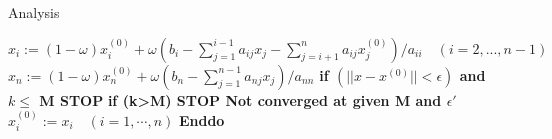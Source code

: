 \documentclass[letterpaper,12pt]{article}
\begin{document}
\begin{section}{Analysis}
\begin{algorithm}[!htbp]
\begin{algorithmic}[1]
                    \State \quad $x_i:=(1-\omega)x_i^{(0)}+\omega(b_i-\sum\limits^{i-1}_{j=1}a_{ij}x_j-\sum\limits^{n}_{j=i+1}a_{ij}x_j^{(0)})/a_{ii}\quad (i=2,...,n-1)$
                    \State \quad $x_n:=(1-\omega)x_n^{(0)}+\omega(b_n-\sum\limits^{n-1}_{j=1}a_{nj}x_j)/a_{nn}$
                    \State \quad \textbf{if $(||x-x^{(0)}||<\epsilon)$ and $k\le$ M STOP}
                    \State \quad \textbf{if (k>M) STOP Not converged at given M and $\epsilon'$}
                    \State \quad $x_i^{(0)}:=x_i\quad (i=1,\cdots,n)$
                    \State \textbf{Enddo}
                  \end{algorithmic}  
                \end{algorithm}  
\end{section}
\end{document}
